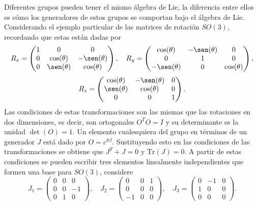 Diferentes grupos pueden tener el mismo álgebra de Lie, la diferencia entre ellos es cómo los generadores de estos grupos se comportan bajo el álgebra de Lie.
Considerando el ejemplo particular de las matrices de rotación $SO(3)$, recordando que estas están dadas por
\begin{equation}
  R_x = \begin{pmatrix}
    1 & 0            & 0             \\
    0 & \cos(\theta) & -\sen(\theta) \\
    0 & \sen(\theta) & \cos(\theta)
  \end{pmatrix}, \quad
  R_y = \begin{pmatrix}
    \cos(\theta)  & -\sen(\theta) & 0            \\
    0             & 1             & 0            \\
    -\sen(\theta) & 0             & \cos(\theta)
  \end{pmatrix},
\end{equation}
\begin{equation}
  R_z = \begin{pmatrix}
    \cos(\theta) & -\sen(\theta) & 0 \\
    \sen(\theta) & \cos(\theta)  & 0 \\
    0            & 0             & 1
  \end{pmatrix}.
\end{equation}
Las condiciones de estas transformaciones son las mismas que las rotaciones en dos dimensiones, es decir, son ortogonales $O^T O = I$ y su determinante es la unidad $\det(O) = 1$. Un elemento cualesquiera del grupo en términos de un generador $J$ está dado por $O = e^{\theta J}$. Sustituyendo esto en las condiciones de las transformaciones se obtiene que $J^T + J = 0$ y $\mathrm{Tr}(J) = 0$. A partir de estas condiciones se pueden escribir tres elementos linealmente independientes que formen una base para $SO(3)$, considere
\begin{equation}
  J_1 = \begin{pmatrix}
    0 & 0 & 0 \\ 0 & 0 & -1 \\ 0 & 1 & 0
  \end{pmatrix}, \quad
  J_2 = \begin{pmatrix}
    0 & 0 & 1 \\ 0 & 0 & 0 \\ -1 & 0 & 0
  \end{pmatrix}, \quad
  J_3 = \begin{pmatrix}
    0 & -1 & 0 \\ 1 & 0 & 0 \\ 0 & 0 & 0
  \end{pmatrix}.
\end{equation}
